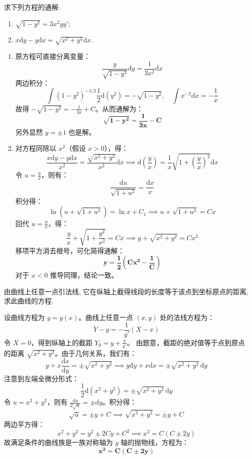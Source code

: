 \documentclass[lang=cn,11pt]{elegantbook}
\begin{document}
\begin{exercise}[求解方程]
求下列方程的通解:
\begin{enumerate}
    \item[(1)] $\displaystyle \sqrt{1-y^2}=3x^2yy'$;
    \item[(2)] $\displaystyle x\mathrm{d}y-y\mathrm{d}x=\sqrt{x^2+y^2}\mathrm{d}x$.
\end{enumerate}
\end{exercise}
\begin{solution}
\begin{enumerate}
    \item[(1)] 原方程可直接分离变量：
    \[
    \frac{y}{\sqrt{1-y^2}}\mathrm{d}y = \frac{1}{3x^2}\mathrm{d}x
    \]
    两边积分：
    \[
    \int (1-y^2)^{-1/2}\frac{1}{2}\mathrm{d}(y^2) = -\sqrt{1-y^2}, \quad \int x^{-2}\mathrm{d}x = -\frac{1}{x}
    \]
    故得 $-\sqrt{1-y^2} = -\frac{1}{3x} + C$。从而通解为：
    \[
    \mathbf{\sqrt{1-y^2} = \frac{1}{3x} - C}
    \]
    另外显然 $y=\pm 1$ 也是解。
    
    \item[(2)] 对方程同除以 $x^2$（假设 $x>0$），得：
    \[
    \frac{x\mathrm{d}y-y\mathrm{d}x}{x^2} = \frac{\sqrt{x^2+y^2}}{x^2}\mathrm{d}x \implies \mathrm{d}\left(\frac{y}{x}\right) = \frac{1}{x}\sqrt{1+\left(\frac{y}{x}\right)^2}\mathrm{d}x
    \]
    令 $u = \frac{y}{x}$，则有：
    \[
    \frac{\mathrm{d}u}{\sqrt{1+u^2}} = \frac{\mathrm{d}x}{x}
    \]
    积分得：
    \[
    \ln(u+\sqrt{1+u^2}) = \ln x + C_1 \implies u+\sqrt{1+u^2} = Cx
    \]
    回代 $u=\frac{y}{x}$，得：
    \[
    \frac{y}{x} + \sqrt{1+\frac{y^2}{x^2}} = Cx \implies y+\sqrt{x^2+y^2} = Cx^2
    \]
    移项平方消去根号，可化简得通解：
    \[
    \mathbf{y = \frac{1}{2}\left(Cx^2 - \frac{1}{C}\right)}
    \]
    对于 $x<0$ 推导同理，结论一致。
\end{enumerate}
\end{solution}

\begin{exercise}[求解方程]
由曲线上任意一点引法线, 它在纵轴上截得线段的长度等于该点到坐标原点的距离, 求此曲线的方程.
\end{exercise}
\begin{solution}
设曲线方程为 $y=y(x)$。曲线上任意一点 $(x,y)$ 处的法线方程为：
\[
Y - y = -\frac{1}{y'}(X - x)
\]
令 $X=0$，得到纵轴上的截距 $Y_0 = y + \frac{x}{y'}$。
由题意，截距的绝对值等于点到原点的距离 $\sqrt{x^2+y^2}$。由于几何关系，我们有：
\[
y + x\frac{\mathrm{d}x}{\mathrm{d}y} = \pm\sqrt{x^2+y^2} \implies y\mathrm{d}y + x\mathrm{d}x = \pm\sqrt{x^2+y^2}\,\mathrm{d}y
\]
注意到左端全微分形式：
\[
\frac{1}{2}\mathrm{d}(x^2+y^2) = \pm\sqrt{x^2+y^2}\,\mathrm{d}y
\]
令 $u = x^2+y^2$，则有 $\displaystyle\frac{\mathrm{d}u}{2\sqrt{u}} = \pm\mathrm{d}y$。积分得：
\[
\sqrt{u} = \pm y + C \implies \sqrt{x^2+y^2} = \pm y + C
\]
两边平方得：
\[
x^2+y^2 = y^2 \pm 2Cy + C^2 \implies x^2 = C(C \pm 2y)
\]
故满足条件的曲线族是一族对称轴为 $y$ 轴的抛物线，方程为：
\[
\mathbf{x^2 = C(C \pm 2y)}
\]
\end{solution}
\end{document}
